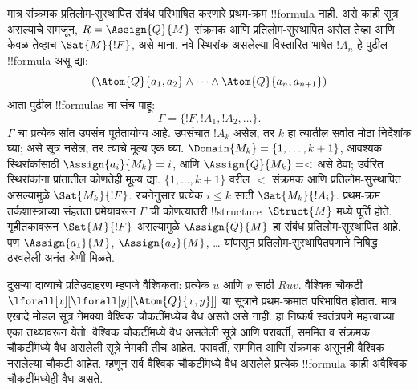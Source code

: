 \documentclass[../../../include/open-logic-section]{subfiles}
\begin{document}
मात्र संक्रमक प्रतिलोम-सुस्थापित संबंध परिभाषित करणारे
प्रथम-क्रम !!{formula} नाही. असे काही सूत्र असल्याचे
समजून, $R =
\Assign{Q}{M}$ संक्रमक आणि प्रतिलोम-सुस्थापित असेल
तेव्हा आणि केवळ तेव्हाच $\Sat{M}{!F}$, असे माना.
नवे स्थिरांक असलेल्या विस्तारित भाषेत $!A_n$ हे
पुढील !!{formula} असू द्या:
\[
(\Atom{Q}{a_1,a_2} \land \dots \land
    \Atom{Q}{a_{n},a_{n+1}})
\]
आता पुढील !!{formula}s चा संच पाहू:
\[
\Gamma = \{!F, !A_1, !A_2, \dots\}.
\]
$\Gamma$ चा प्रत्येक सांत उपसंच पूर्ततायोग्य आहे.
उपसंचात $!A_k$ असेल, तर $k$ हा त्यातील सर्वात मोठा
निर्देशांक घ्या; असे सूत्र नसेल, तर त्याचे मूल्य एक
घ्या. $\Domain{M_k} = \{1, \dots, k+1\}$,
आवश्यक स्थिरांकांसाठी $\Assign{a_i}{M_k} = i$,
आणि $\Assign{Q}{M_k} = <$ असे ठेवा; उर्वरित
स्थिरांकांना प्रांतातील कोणतेही मूल्य द्या.
$\{1,
\dots, k+1\}$ वरील $<$ संक्रमक आणि प्रतिलोम-सुस्थापित
असल्यामुळे $\Sat{M_k}{!F}$. रचनेनुसार प्रत्येक
$i \le k$ साठी $\Sat{M_k}{!A_i}$.
प्रथम-क्रम तर्कशास्त्राच्या संहतता प्रमेयावरून
$\Gamma$ ची कोणत्यातरी !!{structure}~$\Struct{M}$
मध्ये पूर्ति होते. गृहीतकावरून $\Sat{M}{!F}$
असल्यामुळे $\Assign{Q}{M}$ हा संबंध प्रतिलोम-सुस्थापित
आहे. पण $\Assign{a_1}{M}$, $\Assign{a_2}{M}$,
\dots{} यांपासून प्रतिलोम-सुस्थापितपणाने निषिद्ध
ठरवलेली अनंत श्रेणी मिळते.

दुसऱ्या दाव्याचे प्रतिउदाहरण म्हणजे वैश्विकता:
प्रत्येक $u$ आणि $v$ साठी $Ruv$. वैश्विक चौकटी
$\lforall[x][\lforall[y][\Atom{Q}{x,y}]]$ या
सूत्राने प्रथम-क्रमात परिभाषित होतात. मात्र एखादे
मोडल सूत्र नेमक्या वैश्विक चौकटींमध्येच वैध
असते असे नाही. हा निष्कर्ष स्वतंत्रपणे महत्त्वाच्या
एका तथ्यावरून येतो: वैश्विक चौकटींमध्ये वैध
असलेली सूत्रे आणि परावर्ती, सममित व संक्रमक
चौकटींमध्ये वैध असलेली सूत्रे नेमकी तीच आहेत.
परावर्ती, सममित आणि संक्रमक असूनही वैश्विक
नसलेल्या चौकटी आहेत. म्हणून सर्व वैश्विक चौकटींमध्ये
वैध असलेले प्रत्येक !!{formula} काही अवैश्विक
चौकटींमध्येही वैध असते.
\end{document}
